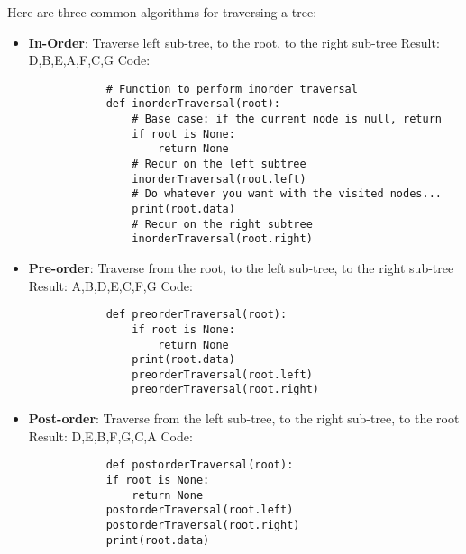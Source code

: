 \documentclass[12pt]{article}
\begin{document}
Here are three common algorithms for traversing a tree:
\begin{itemize}
	\item \textbf{In-Order}: Traverse left sub-tree, to the root, to the right sub-tree
		\subitem Result: D,B,E,A,F,C,G
		\subitem Code:
		\begin{lstlisting}
			# Function to perform inorder traversal
			def inorderTraversal(root):
				# Base case: if the current node is null, return
				if root is None:
					return None
				# Recur on the left subtree
				inorderTraversal(root.left)
				# Do whatever you want with the visited nodes...
				print(root.data)
				# Recur on the right subtree
				inorderTraversal(root.right)
		\end{lstlisting}
	\item \textbf{Pre-order}: Traverse from the root, to the left sub-tree, to the right sub-tree
		\subitem Result: A,B,D,E,C,F,G
		\subitem Code:
		\begin{lstlisting}
			def preorderTraversal(root):
				if root is None:
					return None
				print(root.data)
				preorderTraversal(root.left)
				preorderTraversal(root.right)
		\end{lstlisting}
	\item \textbf{Post-order}: Traverse from the left sub-tree, to the right sub-tree, to the root
		\subitem Result: D,E,B,F,G,C,A
		\subitem Code:
		\begin{lstlisting}			
			def postorderTraversal(root):
			if root is None:
				return None			
			postorderTraversal(root.left)
			postorderTraversal(root.right)
			print(root.data)
		\end{lstlisting}
\end{itemize}
\end{document}
